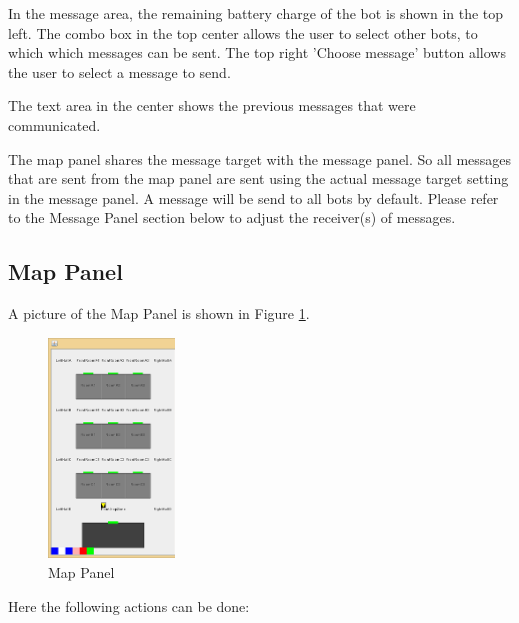In the message area, the remaining battery charge of the bot  is shown in the top left. The combo box in the top center allows the user to select other bots, to which which messages can be sent. The top right 'Choose message' button allows the user to select a message to send.

The text area in the center shows the previous messages that were communicated.

The map panel shares the message target with the message panel. So all messages that are sent from the map panel are sent using the actual message target setting in the message panel. A message will be send to all bots by default. Please refer to the Message Panel section below to adjust the receiver(s) of messages.

\subsection{Map Panel}
A picture of the Map Panel is shown in Figure \ref{fig:mapPanel}.

\begin{figure}[h]
\begin{center}
\includegraphics[width= 0.3\textwidth]{HumanPlayerGUI/hpg-left.png}
\end{center}
\caption{Map Panel}
\label{fig:mapPanel}
\end{figure}

Here the following actions can be done:

